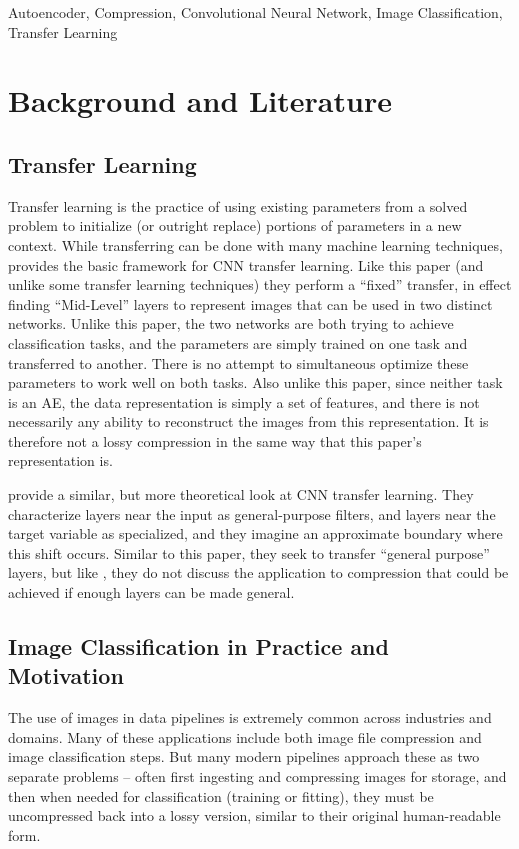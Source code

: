 \documentclass[twoside,11pt]{article}
\begin{document}
\begin{keywords}
    Autoencoder, Compression, Convolutional Neural Network, Image Classification,
    Transfer Learning
\end{keywords}




\section{Background and Literature}

\subsection{Transfer Learning}

Transfer learning is the practice of using existing parameters from a solved problem
to initialize (or outright replace) portions of parameters in a new context.
While transferring can be done with many machine learning techniques, \citet{oquab2014learning}
 provides the basic framework for CNN transfer learning.
Like this paper (and unlike some transfer learning techniques) they perform a 
``fixed'' transfer, in effect finding ``Mid-Level'' layers
to represent images that can be used in two distinct networks. Unlike this paper, the two
networks are both trying to achieve classification tasks, and the parameters are simply trained
on one task and transferred to another. There is no attempt to simultaneous optimize these 
parameters to work well on both tasks. Also unlike this paper, since neither task is an
AE, the data representation is simply a set of features, and there is not necessarily any
ability to reconstruct the images from this representation. It is therefore not a lossy
compression in the same way that this paper's representation is.

\citet{yosinski2014transferable} provide a similar, but more theoretical look at 
CNN transfer learning. They characterize layers near the input as general-purpose filters,
and layers near the target variable as specialized, and they imagine an approximate boundary where
this shift occurs. Similar to this paper, they seek to transfer ``general purpose'' layers,
but like \citet{oquab2014learning}, they do not discuss the application to compression that
could be achieved if enough layers can be made general.

\subsection{Image Classification in Practice and Motivation}
The use of images in data pipelines is extremely common across industries and 
domains. Many of these applications include both image file compression and 
image classification steps. But many modern pipelines approach these as two 
separate problems – often first ingesting and compressing
images for storage, and then when needed for classification 
(training or fitting), they must be uncompressed back into a lossy version, 
similar to their original human-readable form.
\end{document}
